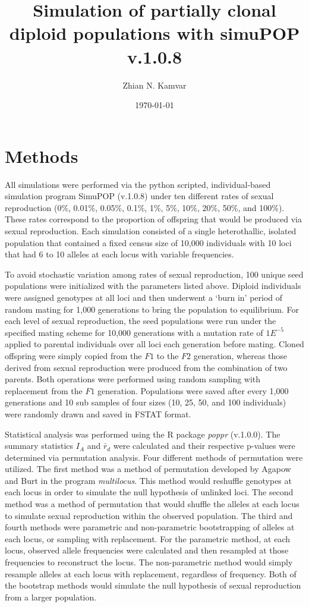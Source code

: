 \documentclass[letterpaper, 10pt]{article}
\title{Simulation of partially clonal diploid populations with simuPOP v.1.0.8}
\author{Zhian N. Kamvar}
\date{\today}
\newcommand{\tab}{\hspace*{1.5em}}
\begin{document}
\maketitle
\linenumbers
{}
\section{Methods}
\tab All simulations were performed via the python scripted, individual-based simulation program SimuPOP (v.1.0.8) under ten different rates of sexual reproduction (0\%, 0.01\%, 0.05\%, 0.1\%, 1\%, 5\%, 10\%, 20\%, 50\%, and 100\%).
These rates correspond to the proportion of offspring that would be produced via sexual reproduction. 
Each simulation consisted of a single heterothallic, isolated population that contained a fixed census size of 10,000 individuals with 10 loci that had 6 to 10 alleles at each locus with variable frequencies. 

To avoid stochastic variation among rates of sexual reproduction, 100 unique seed populations were initialized with the parameters listed above.
Diploid individuals were assigned genotypes at all loci and then underwent a `burn in' period of random mating for 1,000 generations to bring the population to equilibrium. 
For each level of sexual reproduction, the seed populations were run under the specified mating scheme for 10,000 generations with a mutation rate of $1E^{-5}$ applied to parental individuals over all loci each generation before mating. 
Cloned offspring were simply copied from the $F1$ to the $F2$ generation, whereas those derived from sexual reproduction were produced from the combination of two parents. 
Both operations were performed using random sampling with replacement from the $F1$ generation.
Populations were saved after every 1,000 generations and 10 sub samples of four sizes (10, 25, 50, and 100 individuals) were randomly drawn and saved in FSTAT format. 

Statistical analysis was performed using the R package \textit{poppr} (v.1.0.0). 
The summary statistics $I_A$ and $\bar{r}_d$ were calculated and their respective p-values were determined via permutation analysis.
Four different methods of permutation were utilized.
The first method was a method of permutation developed by Agapow and Burt in the program \textit{multilocus}.
This method would reshuffle genotypes at each locus in order to simulate the null hypothesis of unlinked loci. 
The second method was a method of permutation that would shuffle the alleles at each locus to simulate sexual reproduction within the observed population.
The third and fourth methods were parametric and non-parametric bootstrapping of alleles at each locus, or sampling with replacement. 
For the parametric method, at each locus, observed allele frequencies were calculated and then resampled at those frequencies to reconstruct the locus. 
The non-parametric method would simply resample alleles at each locus with replacement, regardless of frequency.
Both of the bootstrap methods would simulate the null hypothesis of sexual reproduction from a larger population. 
\end{document}
